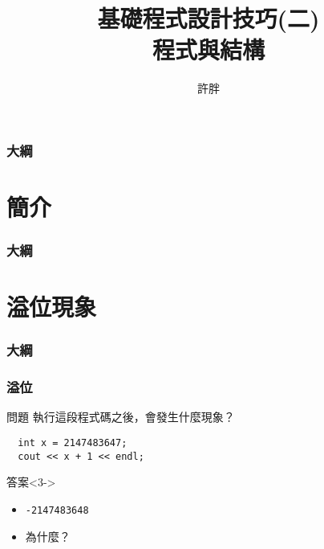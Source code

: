 \documentclass[utf8]{beamer}
\begin{document}
\begin{CJK}{UTF8}{bkai}

\title{基礎程式設計技巧(二)\\程式與結構}
\author{許胖}

\begin{frame}
  \titlepage
\end{frame}
\begin{frame}
  \frametitle{大綱}
  \begin{multicols}{2}
    \tableofcontents
  \end{multicols}
\end{frame}

\section{簡介}
\begin{frame}
  \frametitle{大綱}
  \begin{multicols}{2}
    \tableofcontents[currentsection]
  \end{multicols}
\end{frame}

\section{溢位現象}
\begin{frame}
  \frametitle{大綱}
  \begin{multicols}{2}
    \tableofcontents[currentsection]
  \end{multicols}
\end{frame}

\begin{frame}[fragile]
  \frametitle{溢位}
  \begin{block}{問題}
  執行這段程式碼之後，會發生什麼現象？
  \pause
  \begin{lstlisting}
  int x = 2147483647;
  cout << x + 1 << endl;
  \end{lstlisting}
  \end{block}
  \begin{exampleblock}{答案}<3->
    \begin{itemize}
    \item \texttt{-2147483648}
    \item<4-> 為什麼？
    \end{itemize}
  \end{exampleblock}
\end{frame}


\end{CJK}
\end{document}
